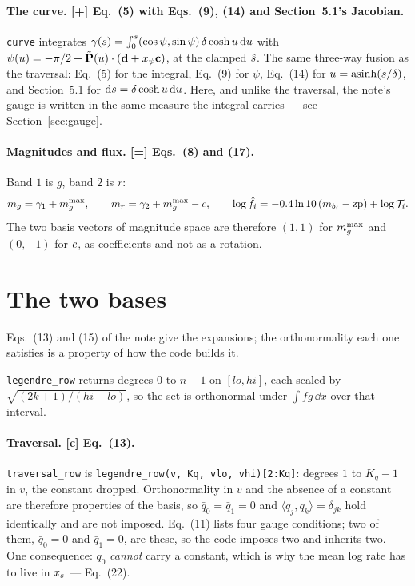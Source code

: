 \documentclass[11pt]{article}
\newcommand{\code}[1]{\texttt{#1}}
\begin{document}
\paragraph{The curve. [+] Eq.~(5) with Eqs.~(9), (14) and Section~5.1's Jacobian.}
\code{curve} integrates
$\gamma(s) = \int_{0}^{s}(\cos\psi, \sin\psi)\,\delta\cosh u\,\mathrm{d} u$ with
$\psi(u) = -\pi/2 + \tilde{\mathbf{P}}(u)\cdot(\mathbf{d} + x_{\psi}\mathbf{c})$, at the
clamped $\hat{s}$. The same three-way fusion as the traversal: Eq.~(5) for the integral,
Eq.~(9) for $\psi$, Eq.~(14) for $u = \operatorname{asinh}(s/\delta)$, and Section~5.1 for
$\mathrm{d}s = \delta\cosh u\,\mathrm{d} u$. Here, and unlike the traversal, the note's gauge is
written in the same measure the integral carries --- see Section~\ref{sec:gauge}.

\paragraph{Magnitudes and flux. [=] Eqs.~(8) and (17).} Band $1$ is $g$, band $2$ is
$r$:
\begin{equation}
  m_{g} = \gamma_{1} + m_{g}^{\max} , \qquad m_{r} = \gamma_{2} + m_{g}^{\max} - c ,
  \qquad
  \log \hat f_{i} = -0.4\ln 10\,(m_{b_{i}} - \mathrm{zp}) + \log\mathcal{T}_{i} .
\end{equation}
The two basis vectors of magnitude space are therefore $(1,1)$ for $m_{g}^{\max}$ and $(0,-1)$
for $c$, as coefficients and not as a rotation.

\section{The two bases}
\label{sec:bases}

Eqs.~(13) and (15) of the note give the expansions; the orthonormality each one satisfies is
a property of how the code builds it.

\code{legendre\_row} returns degrees $0$ to $n-1$ on $[lo, hi]$, each scaled by
$\sqrt{(2k+1)/(hi-lo)}$, so the set is orthonormal under $\int fg\,\dd x$ over that
interval.

\paragraph{Traversal. [c] Eq.~(13).} \code{traversal\_row} is
\code{legendre\_row(v, Kq, vlo, vhi)[2:Kq]}:
degrees $1$ to $K_{q}-1$ in $v$, the constant dropped. Orthonormality in $v$ and the absence
of a constant are therefore properties of the basis, so $\bar q_{0} = \bar q_{1} = 0$ and
$\langle q_{j}, q_{k}\rangle = \delta_{jk}$ hold identically and are not imposed. Eq.~(11)
lists four gauge conditions; two of them, $\bar q_{0} = 0$ and $\bar q_{1} = 0$, are these,
so the code imposes two and inherits two. One consequence: $q_{0}$ \emph{cannot} carry a
constant, which is why the mean log rate has to live in $x_{s}$ --- Eq.~(22).
\end{document}
